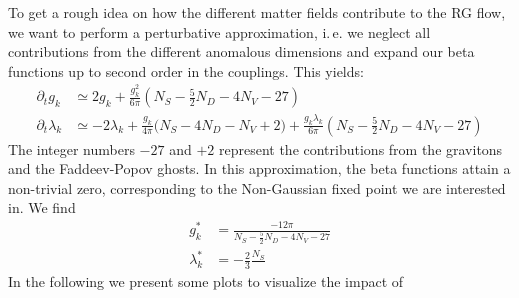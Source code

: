 To get a rough idea on how the different matter fields contribute to the RG flow, we want to perform a perturbative approximation, i.\,e. we neglect all contributions from the different anomalous dimensions and expand our beta functions up to second order in the couplings. This yields:
\begin{equation}
\begin{aligned}
	\partial_tg_k &\simeq 2g_k + \frac{g_k^2}{6\pi}\left(N_S - \frac{5}{2}N_D - 4N_V-27\right) \\[10pt]
	\partial_t\lambda_k &\simeq -2\lambda_k +\frac{g_k}{4\pi}\bigl(N_S-4N_D-N_V+2\bigr) + \frac{g_k\lambda_k}{6\pi}\left(N_S-\frac{5}{2}N_D - 4N_V  -27 \right)
\end{aligned}
\end{equation}
 The integer numbers $-27$ and $+2$ represent the contributions from the gravitons and the Faddeev-Popov ghosts. In this approximation, the beta functions attain a non-trivial zero, corresponding to the Non-Gaussian fixed point we are interested in. We find
 \begin{equation}
 	\begin{aligned}
 		g_k^{*} &= \frac{-12\pi}{N_S - \frac{5}{2}N_D - 4N_V-27} \\[10pt]
 		\lambda_k^{*} &= -\frac{2}{3}\frac{N_S}{}
 	\end{aligned}
 \end{equation}
 In the following we present some plots to visualize the impact of 
